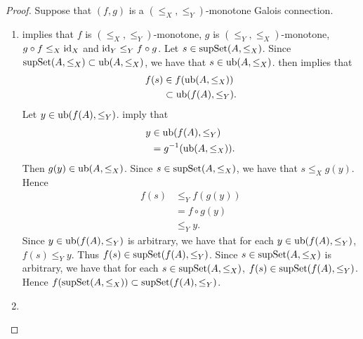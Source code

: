 \documentclass{book}
\begin{document}
	\begin{proof}
		Suppose that $(f,g)$ is a $(\leq_X, \leq_Y)$-monotone Galois connection. 
		\begin{enumerate}
			\item {} implies that $f$ is $(\leq_X, \leq_Y)$-monotone, $g$ is $(\leq_Y, \leq_X)$-monotone, $g \circ f \leq_X \operatorname{id}_X$ and $\operatorname{id}_Y \leq_Y f \circ g$. Let $s \in \operatorname{supSet} (A, \leq_X)$. Since $\operatorname{supSet} (A, \leq_X) \subset \operatorname{ub}(A, \leq_X)$, we have that $s \in \operatorname{ub}(A, \leq_X)$.  then implies that 
			\begin{align*}
				f(s)
				& \in f(\operatorname{ub}(A, \leq_X)) \\
				& \subset \operatorname{ub}(f(A), \leq_Y).
			\end{align*}
			Let $y \in \operatorname{ub}(f(A), \leq_Y)$.  imply that 
			\begin{align*}
				y 
				& \in \operatorname{ub}(f(A), \leq_Y) \\
				& = g^{-1}(\operatorname{ub}(A, \leq_X)).
			\end{align*}
			Then $g(y) \in \operatorname{ub}(A, \leq_X)$. Since $s \in \operatorname{supSet} (A, \leq_X)$, we have that $s \leq_X g(y)$. Hence 
			\begin{align*}
				f(s)
				& \leq_Y f(g(y)) \\
				& = f \circ g(y) \\
				& \leq_Y y.
			\end{align*}
			Since $y \in \operatorname{ub}(f(A), \leq_Y)$ is arbitrary, we have that for each $y \in \operatorname{ub}(f(A), \leq_Y)$, $f(s) \leq_Y y$. Thus $f(s) \in \operatorname{supSet}(f(A), \leq_Y)$. Since $s \in \operatorname{supSet} (A, \leq_X)$ is arbitrary, we have that for each $s \in \operatorname{supSet} (A, \leq_X)$, $f(s) \in \operatorname{supSet} (f(A), \leq_Y)$. Hence $f(\operatorname{supSet} (A, \leq_X)) \subset \operatorname{supSet}(f(A), \leq_Y)$.
			\item {}
		\end{enumerate}
	\end{proof}
	
	
	
	
	
	
	
	
	
	
	
	
	
	
	
	
	
	
	
	
	
	
	
\end{document}
